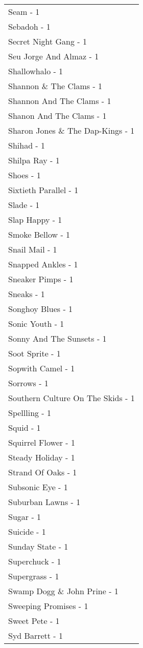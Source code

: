 \documentclass[
]{article}
\begin{document}
\begin{longtable}{l}
Seam - 1 \\ 
Sebadoh - 1 \\ 
Secret Night Gang - 1 \\ 
Seu Jorge And Almaz - 1 \\ 
Shallowhalo - 1 \\ 
Shannon \& The Clams - 1 \\ 
Shannon And The Clams - 1 \\ 
Shanon And The Clams - 1 \\ 
Sharon Jones \& The Dap-Kings - 1 \\ 
Shihad - 1 \\ 
Shilpa Ray - 1 \\ 
Shoes - 1 \\ 
Sixtieth Parallel - 1 \\ 
Slade - 1 \\ 
Slap Happy - 1 \\ 
Smoke Bellow - 1 \\ 
Snail Mail - 1 \\ 
Snapped Ankles - 1 \\ 
Sneaker Pimps - 1 \\ 
Sneaks - 1 \\ 
Songhoy Blues - 1 \\ 
Sonic Youth - 1 \\ 
Sonny And The Sunsets - 1 \\ 
Soot Sprite - 1 \\ 
Sopwith Camel - 1 \\ 
Sorrows - 1 \\ 
Southern Culture On The Skids - 1 \\ 
Spellling - 1 \\ 
Squid - 1 \\ 
Squirrel Flower - 1 \\ 
Steady Holiday - 1 \\ 
Strand Of Oaks - 1 \\ 
Subsonic Eye - 1 \\ 
Suburban Lawns - 1 \\ 
Sugar - 1 \\ 
Suicide - 1 \\ 
Sunday State - 1 \\ 
Superchuck - 1 \\ 
Supergrass - 1 \\ 
Swamp Dogg \& John Prine - 1 \\ 
Sweeping Promises - 1 \\ 
Sweet Pete - 1 \\ 
Syd Barrett - 1 \\ 

\end{longtable}
\end{document}
